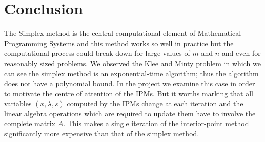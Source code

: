 \documentclass[a4paper,10 pt,titlepage,twoside]{book}
\theoremstyle{plain}
\theoremstyle{definition}
\theoremstyle{remark}
\begin{document}
{{\chapter{Conclusion}
The Simplex method is the central computational element of Mathematical Programming Systems and this method works so well in practice but the computational process could break down for large values of $m$ and $n$ and even for reasonably sized problems.
We observed the Klee and Minty problem in which we can see the simplex method is an exponential-time algorithm; thus the algorithm does not have a polynomial bound. In the project we examine this case in order to motivate the centre of attention of the IPMs.
But it worths marking that all variables $(x, \lambda, s)$ computed by the IPMs change at each iteration and the linear algebra operations which are required to update them have to involve the complete matrix $A$. This makes a single iteration of the interior-point method significantly more expensive than that of the simplex method.\\

}}
\end{document}
